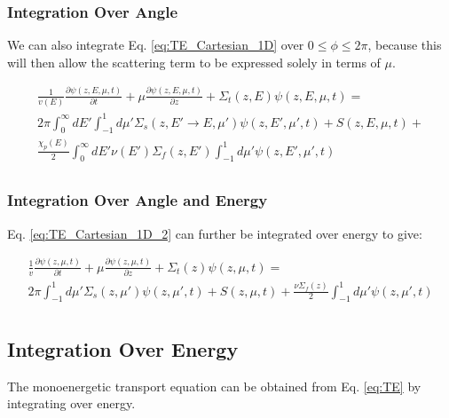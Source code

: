 \documentclass[10pt]{article}
\begin{document}
\begin{flushleft}
\subsubsection{Integration Over Angle}

We can also integrate Eq. \ref{eq:TE_Cartesian_1D} over \(0\leq \phi \leq 2\pi\), because this will then allow the scattering term to be expressed solely in terms of \(\mu\). 

\begin{equation}
\label{eq:TE_Cartesian_1D_2}
\begin{aligned}
\frac{1}{v(E)} \frac{\partial\psi(z, E, \mu,t)}{\partial t} + \mu \frac{\partial \psi(z, E, \mu,t)}{\partial z} +
 \Sigma_t(z,E)\psi(z, E, \mu,t) =\\
 2\pi \int_{0}^{\infty}dE' \int_{-1}^{1} d\mu' \Sigma_s(z, E'\rightarrow E, \mu')\psi(z, E', \mu',t) + S(z, E, \mu, t)+\\
 \frac{\chi_p(E)}{2} \int_{0}^{\infty} dE'\nu(E')\Sigma_f(z, E')\int_{-1}^{1} d\mu'\psi(z, E', \mu',t)\\
\end{aligned}
\end{equation}

\subsubsection{Integration Over Angle and Energy}
Eq. \eqref{eq:TE_Cartesian_1D_2} can further be integrated over energy to give:

\begin{equation}
\label{eq:TE_Cartesian_1D_2_noenergy}
\begin{aligned}
\frac{1}{v} \frac{\partial\psi(z, \mu,t)}{\partial t} + \mu \frac{\partial \psi(z, \mu,t)}{\partial z} +
 \Sigma_t(z)\psi(z, \mu,t) =\\
 2\pi\int_{-1}^{1} d\mu' \Sigma_s(z, \mu')\psi(z,\mu',t) + S(z, \mu, t)+\frac{\nu\Sigma_f(z)}{2}\int_{-1}^{1} d\mu'\psi(z, \mu',t)\\
\end{aligned}
\end{equation}

\subsection{Integration Over Energy}

The monoenergetic transport equation can be obtained from Eq. \eqref{eq:TE} by integrating over energy. 


\end{flushleft}
\end{document}
